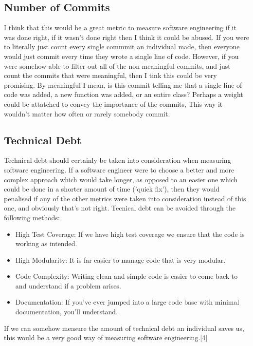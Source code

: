 \documentclass[12pt]{report}
\begin{document}
\subsection{Number of Commits}
I think that this would be a great metric to measure software engineering if it was done right, if it wasn't done right then I think it could be abused. If you were to literally just count every single commmit an individual made, then everyone would just commit every time they wrote a single line of code. However, if you were somehow able to filter out all of the non-meaningful commits, and just count the commits that were meaningful, then I tink this could be very promising. By meaningful I mean, is this commit telling me that a single line of code was added, a new function was added, or an entire class? Perhaps a weight could be attatched to convey the importance of the commits, This way it wouldn't matter how often or rarely somebody commit.

\subsection{Technical Debt}
Technical debt should certainly be taken into consideration when measuring software engineering. If a software engineer were to choose a better and more complex approach which would take longer, as opposed to an easier one which could be done in a shorter amount of time ('quick fix'), then they would penalised if any of the other metrics were taken into consideration instead of this one, and obviously that's not right. Tecnical debt can be avoided through the following methods:
\begin{itemize}
\item High Test Coverage: If we have high test coverage we ensure that the code is working as intended.

\item High Modularity: It is far easier to manage code that is very modular.

\item Code Complexity: Writing clean and simple code is easier to come back to and understand if a problem arises.

\item Documentation: If you've ever jumped into a large code base with minimal documentation, you'll understand.
\end{itemize}  

If we can somehow measure the amount of technical debt an individual saves us, this would be a very good way of measuring software engineering.[4]
\end{document}
